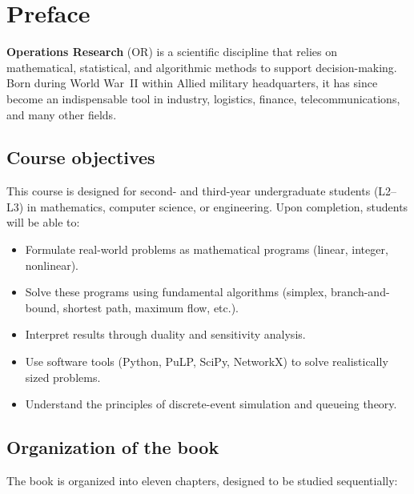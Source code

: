 \chapter*{Preface}

\textbf{Operations Research} (OR) is a scientific discipline that relies on
mathematical, statistical, and algorithmic methods to support decision-making.
Born during World War~II within Allied military headquarters, it has since
become an indispensable tool in industry, logistics, finance,
telecommunications, and many other fields.

\section*{Course objectives}

This course is designed for second- and third-year undergraduate students
(L2--L3) in mathematics, computer science, or engineering.  Upon completion,
students will be able to:

\begin{itemize}
  \item Formulate real-world problems as mathematical programs (linear,
        integer, nonlinear).
  \item Solve these programs using fundamental algorithms (simplex,
        branch-and-bound, shortest path, maximum flow, etc.).
  \item Interpret results through duality and sensitivity analysis.
  \item Use software tools (Python, PuLP, SciPy, NetworkX) to solve
        realistically sized problems.
  \item Understand the principles of discrete-event simulation and queueing
        theory.
\end{itemize}

\section*{Organization of the book}

The book is organized into eleven chapters, designed to be studied
sequentially:

